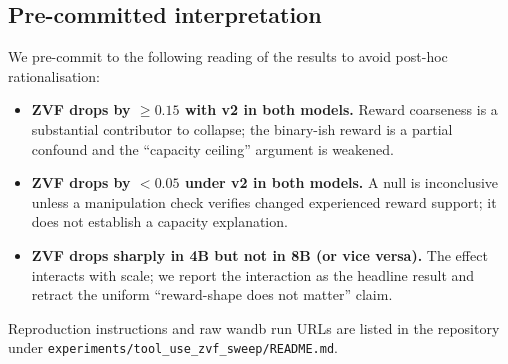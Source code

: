 \subsection{Pre-committed interpretation}
We pre-commit to the following reading of the results to avoid post-hoc
rationalisation:
\begin{itemize}
  \item \textbf{ZVF drops by \(\geq 0.15\) with v2 in both models.}
        Reward coarseness is a substantial contributor to collapse;
        the binary-ish reward is a partial confound and the
        ``capacity ceiling'' argument is weakened.
  \item \textbf{ZVF drops by \(<0.05\) under v2 in both models.}
        A null is inconclusive unless a manipulation check verifies changed
        experienced reward support; it does not establish a capacity explanation.
  \item \textbf{ZVF drops sharply in 4B but not in 8B (or vice versa).}
        The effect interacts with scale; we report the interaction as
        the headline result and retract the uniform ``reward-shape does
        not matter'' claim.
\end{itemize}

Reproduction instructions and raw wandb run URLs are listed in the
repository under \texttt{experiments/tool\_use\_zvf\_sweep/README.md}.
